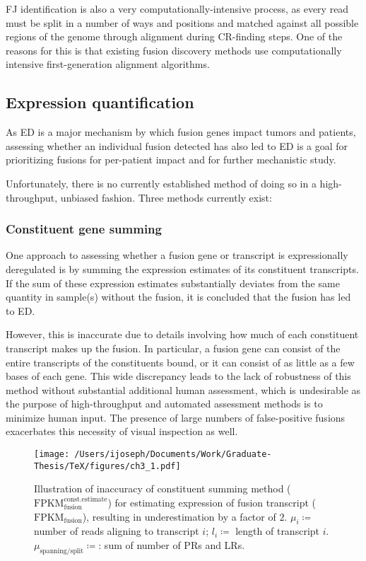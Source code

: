 FJ identification is also a very computationally-intensive process, as every read must be split in a number of ways and positions and matched against all possible regions of the genome through alignment during CR-finding steps. One of the reasons for this is that existing fusion discovery methods use computationally intensive first-generation alignment algorithms. 

\subsection{Expression quantification}

As ED is a major mechanism by which fusion genes impact tumors and patients, assessing whether an individual fusion detected has also led to ED is a goal for prioritizing fusions for per-patient impact and for further mechanistic study.

Unfortunately, there is no currently established method of doing so in a high-throughput, unbiased fashion. Three methods currently exist:

\subsubsection{Constituent gene summing}

One approach to assessing whether a fusion gene or transcript is expressionally deregulated is by summing the expression estimates of its constituent transcripts. If the sum of these expression estimates substantially deviates from the same quantity in sample(s) without the fusion, it is concluded that the fusion has led to ED.

However, this is inaccurate due to details involving how much of each constituent transcript makes up the fusion. In particular, a fusion gene can consist of the entire transcripts of the constituents bound, or it can consist of as little as a few bases of each gene. This wide discrepancy leads to the lack of robustness of this method without substantial additional human assessment, which is undesirable as the purpose of high-throughput and automated assessment methods is to minimize human input. The presence of large numbers of false-positive fusions exacerbates this necessity of visual inspection as well.

\begin{center}
\begin{figure}\centering
  \parbox{.9\textwidth}{\centering
\noindent \texttt{[image: /Users/ijoseph/Documents/Work/Graduate-Thesis/TeX/figures/ch3\_1.pdf]}
    \caption{Illustration of inaccuracy of constituent summing method ($\mathrm{FPKM}_{\mathrm{fusion}}^{\mathrm{const.estimate}}$) for estimating expression of fusion transcript ($\mathrm{FPKM}_\mathrm{fusion}$), resulting in underestimation by a factor of $2$. $\mu_i \coloneqq$ number of reads aligning to transcript $i$; $l_i \coloneqq$ length of transcript $i$. $\mu_{\text{spanning/split}} \coloneqq$: sum of number of PRs and LRs.}}
\end{figure}
\end{center}



